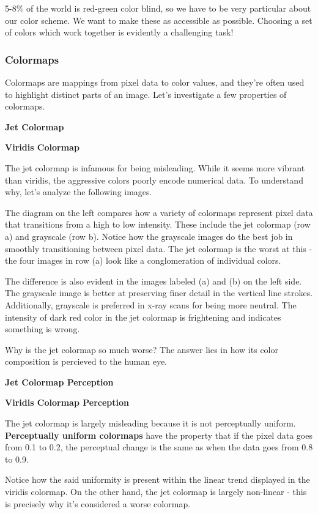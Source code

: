\documentclass[
  letterpaper,
  DIV=11,
  numbers=noendperiod]{scrreprt}
\begin{document}
5-8\% of the world is red-green color blind, so we have to be very
particular about our color scheme. We want to make these as accessible
as possible. Choosing a set of colors which work together is evidently a
challenging task!

\hypertarget{colormaps}{%
\subsubsection{Colormaps}\label{colormaps}}

Colormaps are mappings from pixel data to color values, and they're
often used to highlight distinct parts of an image. Let's investigate a
few properties of colormaps.

\textbf{Jet Colormap}

\textbf{Viridis Colormap}

The jet colormap is infamous for being misleading. While it seems more
vibrant than viridis, the aggressive colors poorly encode numerical
data. To understand why, let's analyze the following images.

The diagram on the left compares how a variety of colormaps represent
pixel data that transitions from a high to low intensity. These include
the jet colormap (row a) and grayscale (row b). Notice how the grayscale
images do the best job in smoothly transitioning between pixel data. The
jet colormap is the worst at this - the four images in row (a) look like
a conglomeration of individual colors.

The difference is also evident in the images labeled (a) and (b) on the
left side. The grayscale image is better at preserving finer detail in
the vertical line strokes. Additionally, grayscale is preferred in x-ray
scans for being more neutral. The intensity of dark red color in the jet
colormap is frightening and indicates something is wrong.

Why is the jet colormap so much worse? The answer lies in how its color
composition is percieved to the human eye.

\textbf{Jet Colormap Perception}

\textbf{Viridis Colormap Perception}

The jet colormap is largely misleading because it is not perceptually
uniform. \textbf{Perceptually uniform colormaps} have the property that
if the pixel data goes from 0.1 to 0.2, the perceptual change is the
same as when the data goes from 0.8 to 0.9.

Notice how the said uniformity is present within the linear trend
displayed in the viridis colormap. On the other hand, the jet colormap
is largely non-linear - this is precisely why it's considered a worse
colormap.
\end{document}
